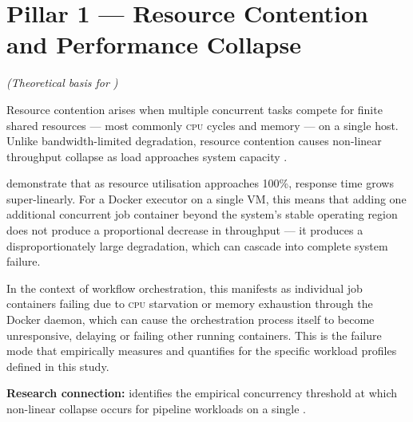 \section{Pillar 1 --- Resource Contention and Performance Collapse}
\textit{(Theoretical basis for )}

Resource contention arises when multiple concurrent tasks compete for finite shared
resources --- most commonly \textsc{cpu} cycles and memory --- on a single host. Unlike
bandwidth-limited degradation, resource contention causes non-linear throughput collapse as
load approaches system capacity \citep{nanda1991}.

\citet{nanda1991} demonstrate that as resource utilisation approaches 100\%, response time
grows super-linearly. For a Docker executor on a single VM, this means that adding one additional
concurrent job container beyond the system's stable operating region does not produce a
proportional decrease in throughput --- it produces a disproportionately large degradation,
which can cascade into complete system failure.

In the context of workflow orchestration, this manifests as individual job containers failing
due to \textsc{cpu} starvation or memory exhaustion through the Docker daemon, which can
cause the orchestration process itself to become unresponsive, delaying or failing other
running containers. This is the failure mode that  empirically measures and quantifies
for the specific workload profiles defined in this study.

\textbf{Research connection:}  identifies the empirical concurrency threshold at
which non-linear collapse occurs for \dagster{} pipeline workloads on a single \vm{}.

